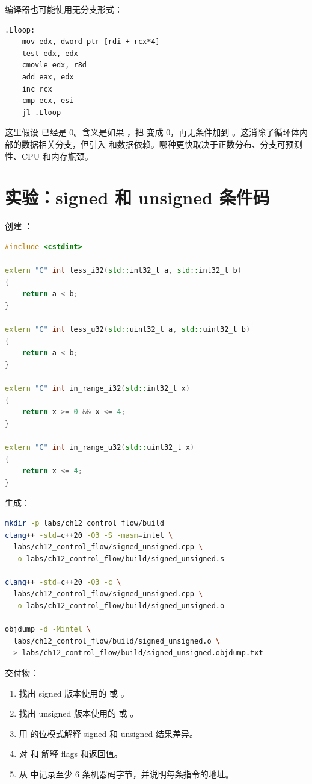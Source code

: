 编译器也可能使用无分支形式：

\begin{lstlisting}
.Lloop:
    mov edx, dword ptr [rdi + rcx*4]
    test edx, edx
    cmovle edx, r8d
    add eax, edx
    inc rcx
    cmp ecx, esi
    jl .Lloop
\end{lstlisting}

这里假设  已经是 0。含义是如果 ，把  变成 0，再无条件加到 。这消除了循环体内部的数据相关分支，但引入  和数据依赖。哪种更快取决于正数分布、分支可预测性、CPU 和内存瓶颈。

\section{实验：signed 和 unsigned 条件码}

\begin{labbox}
创建 ：

\begin{lstlisting}[language=C++]
#include <cstdint>

extern "C" int less_i32(std::int32_t a, std::int32_t b)
{
    return a < b;
}

extern "C" int less_u32(std::uint32_t a, std::uint32_t b)
{
    return a < b;
}

extern "C" int in_range_i32(std::int32_t x)
{
    return x >= 0 && x <= 4;
}

extern "C" int in_range_u32(std::uint32_t x)
{
    return x <= 4;
}
\end{lstlisting}

生成：

\begin{lstlisting}[language=bash]
mkdir -p labs/ch12_control_flow/build
clang++ -std=c++20 -O3 -S -masm=intel \
  labs/ch12_control_flow/signed_unsigned.cpp \
  -o labs/ch12_control_flow/build/signed_unsigned.s

clang++ -std=c++20 -O3 -c \
  labs/ch12_control_flow/signed_unsigned.cpp \
  -o labs/ch12_control_flow/build/signed_unsigned.o

objdump -d -Mintel \
  labs/ch12_control_flow/build/signed_unsigned.o \
  > labs/ch12_control_flow/build/signed_unsigned.objdump.txt
\end{lstlisting}

交付物：

\begin{enumerate}
  \item 找出 signed 版本使用的 \instruction{setcc} 或 。
  \item 找出 unsigned 版本使用的  或 。
  \item 用  的位模式解释 signed 和 unsigned 结果差异。
  \item 对  和  解释 flags 和返回值。
  \item 从  中记录至少 6 条机器码字节，并说明每条指令的地址。
\end{enumerate}
\end{labbox}

